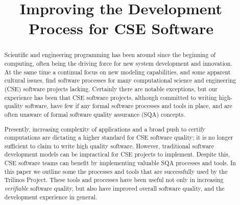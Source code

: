 \documentclass{doublecol}
\begin{document}
\setcounter{page}{1}






\BottomCatch

\title{Improving the Development Process for CSE Software}









\begin{abstract}

Scientific and engineering programming has been around since the
beginning of computing, often being the driving force for new system
development and innovation.  At the same time a continual focus on
new modeling capabilities, and some apparent cultural issues, find
software processes for many computational science and engineering
(CSE) software projects lacking.  Certainly there are notable
exceptions, but our experience has been that CSE software projects,
although committed to writing high-quality software, have few if any
formal software processes and tools in place, and are often unaware
of formal software quality assurance (SQA) concepts.

Presently, increasing complexity of applications and a broad push to
certify computations are dictating a higher standard for CSE
software quality; it is no longer sufficient to claim to write high
quality software. However, traditional software development models
can be impractical for CSE projects to implement. Despite this, CSE
software teams can benefit by implementing valuable SQA processes
and tools.  In this paper we outline some the processes and tools
that are successfully used by the Trilinos Project. These tools and
processes have been useful not only in increasing
\textit{verifiable} software quality, but also have improved overall
software quality, and the development experience in general.

\end{abstract}
\end{document}

